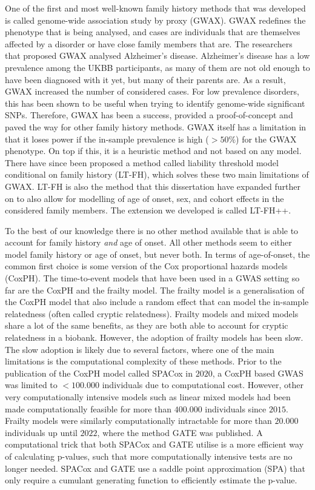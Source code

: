 One of the first and most well-known family history methods that was developed is called genome-wide association study by proxy (GWAX). GWAX redefines the phenotype that is being analysed, and cases are individuals that are themselves affected by a disorder or have close family members that are. The researchers that proposed GWAX analysed Alzheimer's disease. Alzheimer's disease has a low prevalence among the UKBB participants, as many of them are not old enough to have been diagnosed with it yet, but many of their parents are. As a result, GWAX increased the number of considered cases. For low prevalence disorders, this has been shown to be useful when trying to identify genome-wide significant SNPs. Therefore, GWAX has been a success, provided a proof-of-concept and paved the way for other family history methods. GWAX itself has a limitation in that it loses power if the in-sample prevalence is high ($ >50\% $) for the GWAX phenotype. On top if this, it is a heuristic method and not based on any model. There have since been proposed a method called liability threshold model conditional on family history (LT-FH), which solves these two main limitations of GWAX. LT-FH is also the method that this dissertation have expanded further on to also allow for modelling of age of onset, sex, and cohort effects in the considered family members. The extension we developed is called LT-FH++.

To the best of our knowledge there is no other method available that is able to account for family history \textit{and} age of onset. All other methods seem to either model family history or age of onset, but never both. In terms of age-of-onset, the common first choice is some version of the Cox proportional hazards models (CoxPH). The time-to-event models that have been used in a GWAS setting so far are the CoxPH and the frailty model. The frailty model is a generalisation of the CoxPH model that also include a random effect that can model the in-sample relatedness (often called cryptic relatedness). Frailty models and mixed models share a lot of the same benefits, as they are both able to account for cryptic relatedness in a biobank. However, the adoption of frailty models has been slow. The slow adoption is likely due to several factors, where one of the main limitations is the computational complexity of these methods. Prior to the publication of the CoxPH model called SPACox in $ 2020 $, a CoxPH based GWAS was limited to $ <100.000 $ individuals due to computational cost\cite{bi2020fast}. However, other very computationally intensive models such as linear mixed models had been made computationally feasible for more than $ 400.000 $ individuals since $ 2015 $. Frailty models were similarly computationally intractable for more than $ 20.000 $ individuals up until $ 2022 $, where the method GATE was published. A computational trick that both SPACox and GATE utilise is a more efficient way of calculating p-values, such that more computationally intensive tests are no longer needed. SPACox and GATE use a saddle point approximation (SPA) that only require a cumulant generating function to efficiently estimate the p-value.

